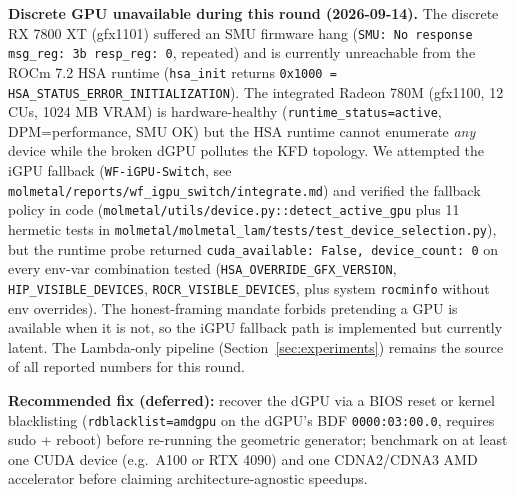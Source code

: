 \begin{enumerate}
  \textbf{Discrete GPU unavailable during this round (2026-09-14).}
  The discrete RX 7800 XT (gfx1101) suffered an SMU firmware hang
  (\texttt{SMU: No response msg\_reg: 3b resp\_reg: 0}, repeated) and
  is currently unreachable from the ROCm 7.2 HSA runtime
  (\texttt{hsa\_init} returns \texttt{0x1000 =
  HSA\_STATUS\_ERROR\_INITIALIZATION}). The integrated Radeon 780M
  (gfx1100, 12 CUs, 1024 MB VRAM) is hardware-healthy
  (\texttt{runtime\_status=active}, DPM=performance, SMU OK) but the
  HSA runtime cannot enumerate \emph{any} device while the broken
  dGPU pollutes the KFD topology. We attempted the iGPU fallback
  (\texttt{WF-iGPU-Switch}, see
  \texttt{molmetal/reports/wf\_igpu\_switch/integrate.md}) and
  verified the fallback policy in code
  (\texttt{molmetal/utils/device.py::detect\_active\_gpu} plus 11
  hermetic tests in
  \texttt{molmetal/molmetal\_lam/tests/test\_device\_selection.py}),
  but the runtime probe returned \texttt{cuda\_available: False,
  device\_count: 0} on every env-var combination tested
  (\texttt{HSA\_OVERRIDE\_GFX\_VERSION},
  \texttt{HIP\_VISIBLE\_DEVICES}, \texttt{ROCR\_VISIBLE\_DEVICES},
  plus system \texttt{rocminfo} without env overrides). The
  honest-framing mandate forbids pretending a GPU is available when
  it is not, so the iGPU fallback path is implemented but currently
  latent. The Lambda-only pipeline (Section~\ref{sec:experiments})
  remains the source of all reported numbers for this round.

  \textbf{Recommended fix (deferred):} recover the dGPU via a BIOS
  reset or kernel blacklisting (\texttt{rdblacklist=amdgpu} on the
  dGPU's BDF \texttt{0000:03:00.0}, requires sudo + reboot) before
  re-running the geometric generator; benchmark on at least one CUDA
  device (e.g.\ A100 or RTX 4090) and one CDNA2/CDNA3 AMD accelerator
  before claiming architecture-agnostic speedups.


\end{enumerate}
